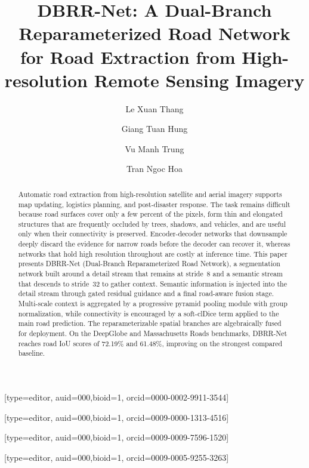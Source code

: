 \documentclass[a4paper,fleqn, review]{cas-sc}
\begin{document}

\title[mode=title]{DBRR-Net: A Dual-Branch Reparameterized Road Network for Road Extraction from High-resolution Remote Sensing Imagery}

\author[1,2]{Le Xuan Thang}[type=editor,
	auid=000,bioid=1,
	orcid=0000-0002-9911-3544]

\author[1,2]{Giang Tuan Hung}[type=editor,
	auid=000,bioid=1,
  orcid=0009-0000-1313-4516]

\author[2]{Vu Manh Trung}[type=editor,
	auid=000,bioid=1,
	orcid=0009-0009-7596-1520]

\author[2]{Tran Ngoc Hoa}[type=editor,
	auid=000,bioid=1,
	orcid=0009-0005-9255-3263]
\cormark[1]




\begin{abstract}
Automatic road extraction from high-resolution satellite and aerial imagery
supports map updating, logistics planning, and post-disaster response. The task
remains difficult because road surfaces cover only a few percent of the pixels,
form thin and elongated structures that are frequently occluded by trees,
shadows, and vehicles, and are useful only when their connectivity is preserved.
Encoder-decoder networks that downsample deeply discard the evidence for narrow
roads before the decoder can recover it, whereas networks that hold high
resolution throughout are costly at inference time. This paper presents
DBRR-Net (Dual-Branch Reparameterized Road Network), a segmentation network
built around a detail stream that remains at stride~8 and a semantic stream
that descends to stride~32 to gather context. Semantic information is injected
into the detail stream through gated residual guidance and a final road-aware
fusion stage. Multi-scale context is aggregated by a progressive pyramid
pooling module with group normalization, while connectivity is encouraged by a
soft-clDice term applied to the main road prediction. The reparameterizable
spatial branches are algebraically fused for deployment. On the DeepGlobe and
Massachusetts Roads benchmarks, DBRR-Net reaches road IoU scores of 72.19\%
and 61.48\%, improving on the strongest compared baseline.
\end{abstract}
\end{document}
